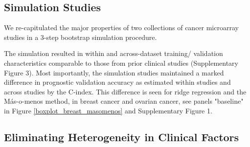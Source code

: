 \documentclass{bioinfo}
\begin{document}
  \subsection{Simulation Studies}

  We re-capitulated the major properties of %
  two collections of cancer microarray studies in a 3-step bootstrap
  simulation procedure. 

  The simulation resulted in within and across-dataset
  training/ validation characteristics comparable to those from prior
  clinical studies (Supplementary Figure 3).  Most importantly, the
  simulation studies maintained a marked difference in prognostic
  validation accuracy as estimated within studies and across studies
  by the C-index. This difference is seen for ridge regression 
  and the M\'{a}s-o-menos method, in breast cancer and ovarian cancer, 
  see panels "baseline" in Figure \ref{boxplot_breast_masomenos} and Supplementary Figure 1.



  \subsection{Eliminating Heterogeneity in Clinical Factors}
\end{document}
